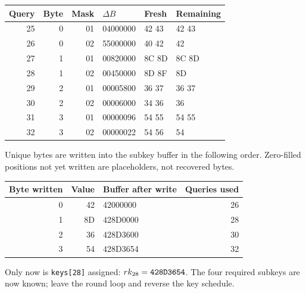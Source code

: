 \begin{center}\small\begin{tabular}{rrrlll}\toprule
Query & Byte & Mask & $\Delta B$ & Fresh & Remaining\\\midrule
25 & 0 & 01 & 04000000 & 42 43 & 42 43\\
26 & 0 & 02 & 55000000 & 40 42 & 42\\
27 & 1 & 01 & 00820000 & 8C 8D & 8C 8D\\
28 & 1 & 02 & 00450000 & 8D 8F & 8D\\
29 & 2 & 01 & 00005800 & 36 37 & 36 37\\
30 & 2 & 02 & 00006000 & 34 36 & 36\\
31 & 3 & 01 & 00000096 & 54 55 & 54 55\\
32 & 3 & 02 & 00000022 & 54 56 & 54\\
\bottomrule\end{tabular}\end{center}
Unique bytes are written into the subkey buffer in the following order. Zero-filled positions not yet written are placeholders, not recovered bytes.
\begin{center}\small\begin{tabular}{rrlr}\toprule
Byte written & Value & Buffer after write & Queries used\\\midrule
0 & 42 & 42000000 & 26\\
1 & 8D & 428D0000 & 28\\
2 & 36 & 428D3600 & 30\\
3 & 54 & 428D3654 & 32\\
\bottomrule\end{tabular}\end{center}
Only now is \texttt{keys[28]} assigned: $rk_{28}=\texttt{428D3654}$. The four required subkeys are now known; leave the round loop and reverse the key schedule.
